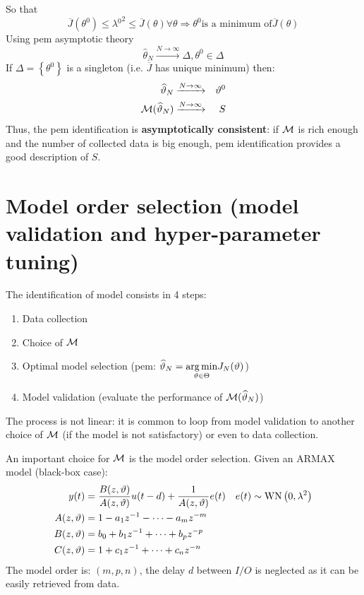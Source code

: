 So that
\begin{equation*}
\overline{J}\left(\theta ^{0}\right) \leq \lambda {^{0}}^{2} \leq \overline{J}(\theta) \forall \theta \Longrightarrow \theta ^{0} \text{is a minimum of} \overline{J}(\theta)
\end{equation*}
Using \gls{pem} asymptotic theory
\begin{equation*}
\hat{\theta }_{N}\xrightarrow{N\rightarrow \infty} \Delta ,\theta ^{0} \in \Delta 
\end{equation*}
If $ \Delta =\left\{\theta ^{0}\right\}$ is a singleton (i.e. $ \overline{J}$ has unique minimum) then:
\begin{equation*}
\begin{aligned}
\widehat{\vartheta }_{N} & \xrightarrow{N\rightarrow \infty} & \vartheta ^{0}\\
\mathcal{M}(\widehat{\vartheta }_{N}) & \xrightarrow{N\rightarrow \infty} & S
\end{aligned}
\end{equation*}
Thus, the \gls{pem} identification is \textbf{asymptotically consistent}: if $ \mathcal{M}$ is rich enough and the number of collected data is big enough, \gls{pem} identification provides a good description of $ S$.



\section{Model order selection (model validation and hyper-parameter tuning)}

The identification of model consists in 4 steps:
\begin{enumerate}
\item Data collection
\item Choice of $ \mathcal{M}$
\item Optimal model selection (\gls{pem}: $ \widehat{\vartheta }_{N} =\underset{\vartheta \in \Theta }{\operatorname*{arg\,min}} J_{N}(\vartheta)$)
\item Model validation (evaluate the performance of $\mathcal{M}(\widehat{\vartheta }_{N})$)
\end{enumerate}

The process is not linear: it is common to loop from model validation to another choice of $ \mathcal{M}$ (if the model is not satisfactory) or even to data collection.

An important choice for $ \mathcal{M}$ is the model order selection. Given an ARMAX model (black-box case):
\begin{gather*}
\begin{aligned}
y(t)  & =\frac{B(z,\vartheta)}{A(z,\vartheta)} u(t-d) +\frac{1}{A(z,\vartheta)} e(t) & e(t) \sim \operatorname{WN} \left(0,\lambda ^{2}\right)\\
A(z,\vartheta)  & =1-a_{1} z^{-1} -\cdots -a_{m} z^{-m} & \\
B(z,\vartheta) & =b_{0} +b_{1} z^{-1} +\cdots +b_{p} z^{-p} & \\
C(z,\vartheta) & =1+c_{1} z^{-1} +\cdots +c_{n} z^{-n} & 
\end{aligned}\\
\end{gather*}
The model order is: $ (m,p,n)$, the delay $ d$ between $ I/O$ is neglected as it can be easily retrieved from data.

